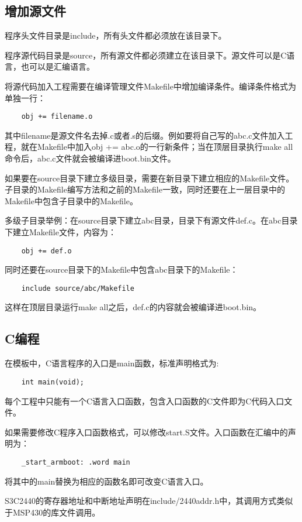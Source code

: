 \documentclass[a4paper,11pt]{article}
\begin{document}
\subsection{增加源文件}
程序头文件目录是include，所有头文件都必须放在该目录下。
\par
程序源代码目录是source，所有源文件都必须建立在该目录下。源文件可以是C语言，也可以是汇编语言。
\par
将源代码加入工程需要在编译管理文件Makefile中增加编译条件。编译条件格式为单独一行：
\begin{lstlisting}
	obj += filename.o
\end{lstlisting}
其中filename是源文件名去掉.c或者.s的后缀。例如要将自己写的abc.c文件加入工程，就在Makefile中加入obj += abc.o的一行新条件；当在顶层目录执行make all命令后，abc.c文件就会被编译进boot.bin文件。
\par
如果要在source目录下建立多级目录，需要在新目录下建立相应的Makefile文件。子目录的Makefile编写方法和之前的Makefile一致，同时还要在上一层目录中的Makefile中包含子目录中的Makefile。
\par
多级子目录举例：在source目录下建立abc目录，目录下有源文件def.c。在abc目录下建立Makefile文件，内容为：
\begin{lstlisting}
	obj += def.o
\end{lstlisting}
同时还要在source目录下的Makefile中包含abc目录下的Makefile：
\begin{lstlisting}
	include source/abc/Makefile
\end{lstlisting}
这样在顶层目录运行make all之后，def.c的内容就会被编译进boot.bin。

\subsection{C编程}
在模板中，C语言程序的入口是main函数，标准声明格式为:
\begin{lstlisting}
	int main(void);
\end{lstlisting}
每个工程中只能有一个C语言入口函数，包含入口函数的C文件即为C代码入口文件。
\par
如果需要修改C程序入口函数格式，可以修改start.S文件。入口函数在汇编中的声明为：
\begin{lstlisting}
	_start_armboot:	.word main
\end{lstlisting}
将其中的main替换为相应的函数名即可改变C语言入口。
\par
S3C2440的寄存器地址和中断地址声明在include/2440addr.h中，其调用方式类似于MSP430的库文件调用。

\end{document}
